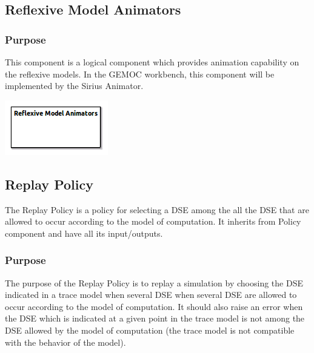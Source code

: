 \documentclass{gemoc} %
\begin{document}
\subsection{Reflexive Model Animators}
\label{sec:Reflexive_Model_Animators}


\subsubsection{Purpose}
This component is a logical component which provides animation capability on the reflexive models. In the GEMOC workbench, this component will be implemented by the Sirius Animator.

\begin{center}
\includegraphics*[trim=0.0cm 0.0cm 0cm 0.0cm, clip=true]{../images/generated/Generated_Reflexive_Model_Animators.png}
\end{center}




\subsection{Replay Policy}
\label{sec:Replay_Policy}
The Replay Policy is a policy for selecting a DSE among the all the DSE that are allowed to occur according to the model of computation.
It inherits from Policy component and have all its input/outputs.

\subsubsection{Purpose}
The purpose of the Replay Policy is to replay a simulation by choosing the DSE indicated in a trace model when several DSE when several DSE are allowed to occur according to the model of computation. It should also raise an error when the DSE which is indicated at a given point in the trace model is not among the DSE allowed by the model of computation (the trace model is not compatible with the behavior of the model).
\end{document}
